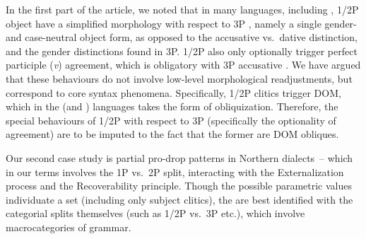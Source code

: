 \documentclass[output=paper]{langsci/langscibook}
\begin{document}
In the first part of the article, we noted that in many  languages,
including , 1/2P object  have a simplified morphology with
respect to 3P , namely a single gender- and case-neutral object form, as
opposed to the accusative vs.\ dative distinction, and the gender distinctions
found in 3P. 1/2P  also only optionally trigger perfect participle
(\emph{v}) agreement, which is obligatory with 3P accusative . We have
argued that these behaviours do not involve low-level morphological
readjustments, but correspond to core syntax phenomena.  Specifically, 1/2P
clitics trigger DOM, which in the  (and ) languages takes
the form of obliquization. Therefore, the special behaviours of 1/2P 
with respect to 3P  (specifically the optionality of agreement) are to
be imputed to the fact that the former are DOM obliques.

Our second case study is partial pro-drop patterns in Northern  dialects~–
which in our terms involves the 1P vs.\ 2P split, interacting with the
Externalization process and the Recoverability principle. Though the possible
parametric values individuate a  set (including only subject
clitics), the  are best identified with the categorial splits
themselves (such as 1/2P vs.\ 3P etc.), which involve macrocategories of
grammar.

\printchapterglossary

{\sloppy\printbibliography[heading=subbibliography,notkeyword=this]}
\end{document}
